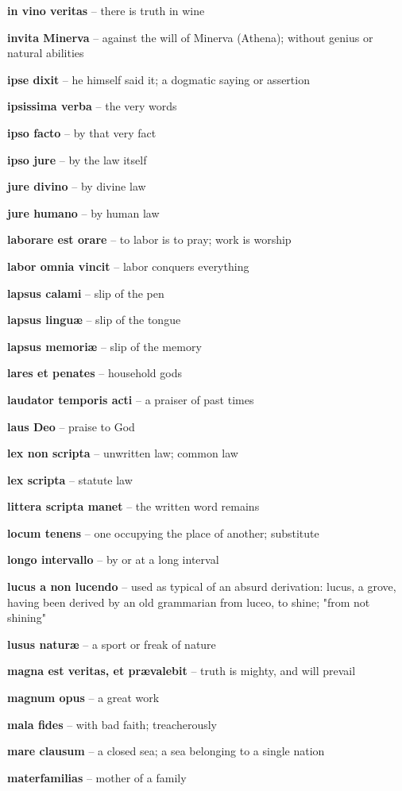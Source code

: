 \documentclass[12pt]{article}
\newcommand{\lat}[1]{\textbf{#1}}
\begin{document}
\lat{in vino veritas} -- there is truth in wine

\lat{invita Minerva} -- against the will of Minerva (Athena); without genius or natural abilities

\lat{ipse dixit} -- he himself said it; a dogmatic saying or assertion

\lat{ipsissima verba} -- the very words

\lat{ipso facto} -- by that very fact

\lat{ipso jure} -- by the law itself

\lat{jure divino} -- by divine law

\lat{jure humano} -- by human law

\lat{laborare est orare} -- to labor is to pray; work is worship

\lat{labor omnia vincit} -- labor conquers everything

\lat{lapsus calami} -- slip of the pen

\lat{lapsus lingu\ae} -- slip of the tongue

\lat{lapsus memori\ae} -- slip of the memory

\lat{lares et penates} -- household gods

\lat{laudator temporis acti} -- a praiser of past times

\lat{laus Deo} -- praise to God

\lat{lex non scripta} -- unwritten law; common law

\lat{lex scripta} -- statute law

\lat{littera scripta manet} -- the written word remains

\lat{locum tenens} -- one occupying the place of another; substitute

\lat{longo intervallo} -- by or at a long interval

\lat{lucus a non lucendo} -- used as typical of an absurd derivation: lucus, a grove, having been derived by an old grammarian from luceo, to shine; "from not shining"

\lat{lusus natur\ae} -- a sport or freak of nature

\lat{magna est veritas, et pr{\ae}valebit} -- truth is mighty, and will prevail

\lat{magnum opus} -- a great work

\lat{mala fides} -- with bad faith; treacherously

\lat{mare clausum} -- a closed sea; a sea belonging to a single nation

\lat{materfamilias} -- mother of a family
\end{document}
